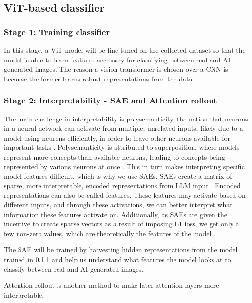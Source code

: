 \documentclass[10pt,twocolumn,letterpaper]{article}
\begin{document}
\subsection{ViT-based classifier}
\subsubsection{Stage 1: Training classifier}
\label{subsubsec:vit-training}
In this stage, a ViT model \cite{dosovitskiyImageWorth16x162021} will be fine-tuned on the collected dataset so that the model is able to learn features necessary for classifying between real and AI-generated images. The reason a vision transformer is chosen over a CNN is because the former learns robust representations from the data.

\subsubsection{Stage 2: Interpretability - SAE and Attention rollout}

The main challenge in interpretability is polysemanticity, the notion that neurons in a neural network can activate from multiple, unrelated inputs, likely due to a model using neurons efficiently, in order to leave other neurons available for important tasks \cite{olah2020zoom}. Polysemanticity is attributed to superposition, where models represent more concepts than available neurons, leading to concepts being represented by various neurons at once  \cite{karvonen_intuitive_2024}.  This in turn makes interpreting specific model features difficult, which is why we use SAEs. SAEs create a matrix of sparse, more interpretable, encoded representations from LLM input  \cite{karvonen_intuitive_2024}. Encoded representations can also be called features. These features may activate based on different inputs, and through these activations, we can better interpret what information these features activate on. Additionally, as SAEs are given the incentive to create sparse vectors as a result of imposing L1 loss, we get only a few non-zero values, which are theoretically the  features of the model \cite{kutsyk_sparse_2024}. 

The SAE will be trained by harvesting hidden representations from the model trained in \ref{subsubsec:vit-training} and help us understand what features the model looks at to classify between real and AI generated images.



Attention rollout \cite{abnarQuantifyingAttentionFlow2020} is another method to make later attention layers more interpretable.
\end{document}

